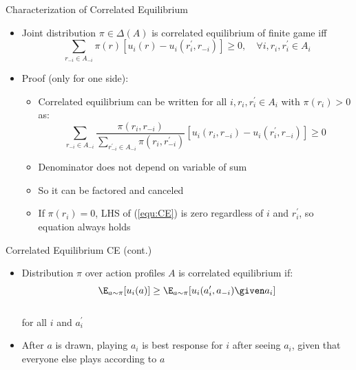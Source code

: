 \documentclass[11pt,aspectratio=169,handout]{beamer}
\begin{document}
  \begin{frame}{Characterization of Correlated Equilibrium}
   \begin{itemize}[<+->] 
    \item Joint distribution $\pi \in \Delta(A)$ is correlated equilibrium of finite game iff
    \begin{equation}
    \label{equ:CE}
     \sum_{r_{-i} \in A_{-i}} \pi(r) \left[u_i(r) - u_i(r^{\prime}_i, r_{-i})\right] \ge 0,\quad  \forall i, r_i, r^{\prime}_i \in A_i
    \end{equation}
    \item Proof (only for one side):
    \begin{itemize}
     \item Correlated equilibrium can be written for all $i, r_i, r^{\prime}_i \in A_i$ with $\pi(r_i) > 0$ as:
     $$
      \sum_{r_{-i} \in A_{-i}} \frac{\pi(r_i,r_{-i})}{\sum_{r^{\prime}_{-i} \in A_{-i}} \pi(r_i, r^{\prime}_{-i})} \left[u_i(r_i, r_{-i}) - u_i(r^{\prime}_i, r_{-i})\right] \ge 0
     $$
     \item Denominator does not depend on variable of sum
     \item So it can be factored and canceled
     \item If $\pi(r_i) = 0$, LHS of (\ref{equ:CE}) is zero regardless of $i$ and $r^{\prime}_i$, so equation always holds
    \end{itemize}
   \end{itemize}
  \end{frame}

   \begin{frame}{Correlated Equilibrium  CE (cont.)}
   \begin{itemize}[<+->]
   \setlength{\itemsep}{1.5em}
    \item Distribution $\pi$ over action profiles $A$ is correlated equilibrium if:
    $$\E_{a \sim \pi}[u_i(a)] \geq \E_{a \sim \pi}[u_i(a_i^\prime, a_{-i}) \given a_i]$$\\
    for all $i$ and $a_i^\prime$
    \item After $a$ is drawn, playing $a_i$ is best response for $i$ \alert{after} seeing $a_i$, given that everyone else plays according to $a$
   \end{itemize}
  \end{frame}
\end{document}

